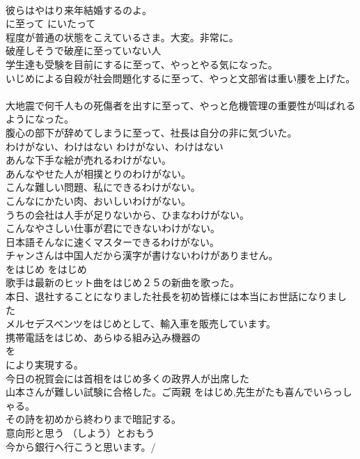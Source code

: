 \documentclass[8pt]{extreport}
\begin{document}
\begin{CJK}{UTF8}{min}
\\	彼らはやはり来年結婚するのよ。   
\\	に至って	にいたって	
\\	程度が普通の状態をこえているさま。大変。非常に。	
\\	破産しそうで破産に至っていない人   
\\	学生達も受験を目前にするに至って、やっとやる気になった。   
\\	いじめによる自殺が社会問題化するに至って、やっと文部省は重い腰を上げた。   
\\	大地震で何千人もの死傷者を出すに至って、やっと危機管理の重要性が叫ばれるようになった。  
\\	腹心の部下が辞めてしまうに至って、社長は自分の非に気づいた。  
\\	わけがない、わけはない	わけがない、わけはない	
\\	あんな下手な絵が売れるわけがない。  
\\	あんなやせた人が相撲とりのわけがない。  
\\	こんな難しい問題、私にできるわけがない。   
\\	こんなにかたい肉、おいしいわけがない。   
\\	うちの会社は人手が足りないから、ひまなわけがない。  
\\	こんなやさしい仕事が君にできないわけがない。  
\\	日本語そんなに速くマスターできるわけがない。  
\\	チャンさんは中国人だから漢字が書けないわけがありません。  
\\	をはじめ	をはじめ	
\\	歌手は最新のヒット曲をはじめ２５の新曲を歌った。  
\\	本日、退社することになりました社長を初め皆様には本当にお世話になりました  
\\	メルセデスベンツをはじめとして、輸入車を販売しています。  
\\	携帯電話をはじめ、あらゆる組み込み機器の
\\	を
\\	により実現する。  
\\	今日の祝賀会には首相をはじめ多くの政界人が出席した   
\\	山本さんが難しい試験に合格した。ご両親 をはじめ,先生がたも喜んでいらっしゃる。   
\\	その詩を初めから終わりまで暗記する。   
\\	意向形と思う	（しよう）とおもう	
\\	今から銀行へ行こうと思います。/ 

\end{CJK}
\end{document}
